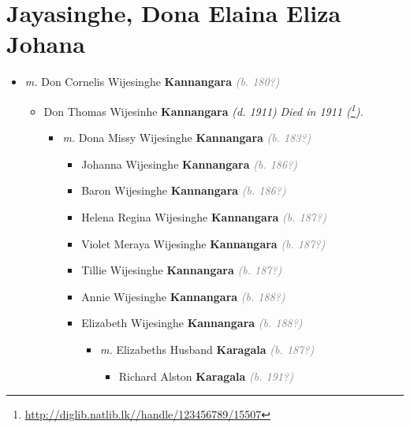 \documentclass[10pt, openany]{book}
\begin{document}
\chapter{Jayasinghe, Dona Elaina Eliza Johana}
\label{00000324}
\textcolor{slmaroon}{\textit{}}
\begin{itemize}
\item{\textit{m.} Don Cornelis Wijesinghe \textbf{Kannangara} \textcolor{gray}{\textit{(b. 180?)}}   \label{couple:00000324:00000401} \begin{itemize}
\item{Don Thomas Wijesinhe \textbf{Kannangara} \textcolor{slorange}{\textit{(d. 1911)}} \textcolor{slmaroon}{\textit{Died in 1911 (\footnote{\url{http://diglib.natlib.lk//handle/123456789/15507}}).}}
\begin{itemize}
\item{\textit{m.} Dona Missy Wijesinghe \textbf{Kannangara} \textcolor{gray}{\textit{(b. 183?)}}   \label{couple:00000409:00000424} \begin{itemize}
\item{Johanna Wijesinghe \textbf{Kannangara} \textcolor{gray}{\textit{(b. 186?)}}
  }
\item{Baron Wijesinghe \textbf{Kannangara} \textcolor{gray}{\textit{(b. 186?)}}
  }
\item{Helena Regina Wijesinghe \textbf{Kannangara} \textcolor{gray}{\textit{(b. 187?)}}
   }
\item{Violet Meraya Wijesinghe \textbf{Kannangara} \textcolor{gray}{\textit{(b. 187?)}}
   }
\item{Tillie Wijesinghe \textbf{Kannangara} \textcolor{gray}{\textit{(b. 187?)}}
  }
\item{Annie Wijesinghe \textbf{Kannangara} \textcolor{gray}{\textit{(b. 188?)}}
  }
\item{Elizabeth Wijesinghe \textbf{Kannangara} \textcolor{gray}{\textit{(b. 188?)}}
\begin{itemize}
\item{\textit{m.} Elizabeths Husband \textbf{Karagala} \textcolor{gray}{\textit{(b. 187?)}}   \label{couple:00000429:00000465} \begin{itemize}
\item{Richard Alston \textbf{Karagala} \textcolor{gray}{\textit{(b. 191?)}}
}
\end{itemize}}
\end{itemize}}
\end{itemize}}
\end{itemize}}
\end{itemize}}
\end{itemize}
\end{document}
